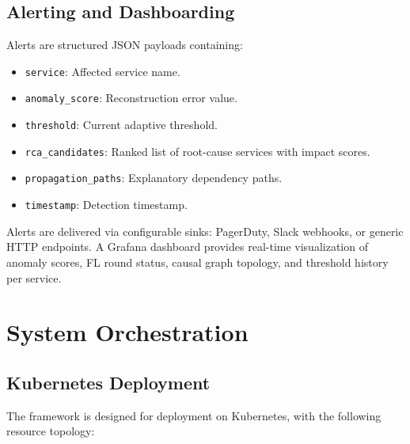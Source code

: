 \subsection{Alerting and Dashboarding}
\label{subsec:design_alerting}

Alerts are structured JSON payloads containing:

\begin{itemize}
    \item \texttt{service}: Affected service name.
    \item \texttt{anomaly\_score}: Reconstruction error value.
    \item \texttt{threshold}: Current adaptive threshold.
    \item \texttt{rca\_candidates}: Ranked list of root-cause services with
    impact scores.
    \item \texttt{propagation\_paths}: Explanatory dependency paths.
    \item \texttt{timestamp}: Detection timestamp.
\end{itemize}

Alerts are delivered via configurable sinks: PagerDuty, Slack webhooks, or
generic HTTP endpoints. A Grafana dashboard provides real-time visualization of
anomaly scores, FL round status, causal graph topology, and threshold history
per service.

\section{System Orchestration}
\label{sec:design_orchestration}

\subsection{Kubernetes Deployment}
\label{subsec:design_k8s}

The framework is designed for deployment on Kubernetes, with the following
resource topology:

